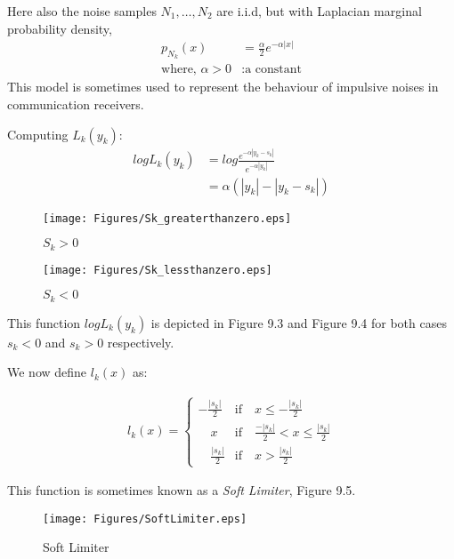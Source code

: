 \documentclass[12pt]{report}
\begin{document}
	\begin{exmp}
		Here also the noise samples $N_1, \ldots ,N_2$ are i.i.d, but with Laplacian marginal probability density,
		\begin{align*}
		p_{N_k}(x) &= \frac{\alpha}{2}e^{-\alpha |x|}\\
		\text{where, } \alpha >0 &: \text{a constant}
		\end{align*}
		This model is sometimes used to represent the behaviour of impulsive noises in communication receivers.
		
		Computing $L_k(y_k)$:
		\begin{align*}
		log L_k(y_k) &= log \frac{e^{- \alpha |y_k-s_k|}}{e^{- \alpha |y_k|}}\\
		&= \alpha (|y_k|-|y_k-s_k|)
		\end{align*}
		
		\begin{figure}[h]
			\centering
			\texttt{[image: Figures/Sk\_greaterthanzero.eps]}
			\caption{$S_k>0$}
			\label{fig:Sk_greaterthanzero}
		\end{figure}
		
		\begin{figure}[h]
			\centering
			\texttt{[image: Figures/Sk\_lessthanzero.eps]}
			\caption{$S_k<0$}
			\label{fig:Sk_lessthanzero}
		\end{figure}
		
		This function $log L_k(y_k)$ is depicted in Figure 9.3 and Figure 9.4 for both cases $ s_k<0$ and $s_k>0$ respectively.
		
		We now define $l_k(x)$ as:
		
		\begin{align*}
		l_k(x)=
		\begin{cases}
		- \frac{|s_k|}{2} &\text{if} \quad x \leq - \frac{|s_k|}{2}\\
		\quad x &\text{if} \quad \frac{-|s_k|}{2} < x \leq \frac{|s_k|}{2}\\
		\quad\frac{|s_k|}{2} &\text{if} \quad x > \frac{|s_k|}{2}
		\end{cases}
		\end{align*}
		
		This function is sometimes known as a \textit{Soft Limiter}, Figure 9.5.
		
		\begin{figure}[h]
			\centering
			\texttt{[image: Figures/SoftLimiter.eps]}
			\caption{Soft Limiter}
			\label{fig:SoftLimiter}
		\end{figure}
		

\end{exmp}
\end{document}
